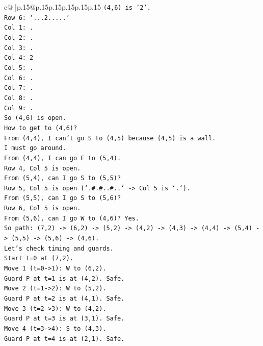 \documentclass{article}
\begin{document}
{\begin{supertabular}{c@{$\;$}|p{.15\linewidth}@{}p{.15\linewidth}p{.15\linewidth}p{.15\linewidth}p{.15\linewidth}p{.15\linewidth}}
{{{\texttt{(4,6) is '2'.} \\
\texttt{Row 6: `...2.....`} \\
\texttt{Col 1: .} \\
\texttt{Col 2: .} \\
\texttt{Col 3: .} \\
\texttt{Col 4: 2} \\
\texttt{Col 5: .} \\
\texttt{Col 6: .} \\
\texttt{Col 7: .} \\
\texttt{Col 8: .} \\
\texttt{Col 9: .} \\
\texttt{So (4,6) is open.} \\
\texttt{How to get to (4,6)?} \\
\texttt{From (4,4), I can't go S to (4,5) because (4,5) is a wall.} \\
\texttt{I must go around.} \\
\texttt{From (4,4), I can go E to (5,4).} \\
\texttt{Row 4, Col 5 is open.} \\
\texttt{From (5,4), can I go S to (5,5)?} \\
\texttt{Row 5, Col 5 is open (`.\#.\#..\#..` {-}> Col 5 is `.`).} \\
\texttt{From (5,5), can I go S to (5,6)?} \\
\texttt{Row 6, Col 5 is open.} \\
\texttt{From (5,6), can I go W to (4,6)? Yes.} \\
\texttt{So path: (7,2) {-}> (6,2) {-}> (5,2) {-}> (4,2) {-}> (4,3) {-}> (4,4) {-}> (5,4) {-}> (5,5) {-}> (5,6) {-}> (4,6).} \\
\texttt{Let's check timing and guards.} \\
\texttt{Start t=0 at (7,2).} \\
\texttt{Move 1 (t=0{-}>1): W to (6,2).} \\
\texttt{Guard P at t=1 is at (4,2). Safe.} \\
\texttt{Move 2 (t=1{-}>2): W to (5,2).} \\
\texttt{Guard P at t=2 is at (4,1). Safe.} \\
\texttt{Move 3 (t=2{-}>3): W to (4,2).} \\
\texttt{Guard P at t=3 is at (3,1). Safe.} \\
\texttt{Move 4 (t=3{-}>4): S to (4,3).} \\
\texttt{Guard P at t=4 is at (2,1). Safe.} \\
}}}
\end{supertabular}}
\end{document}
